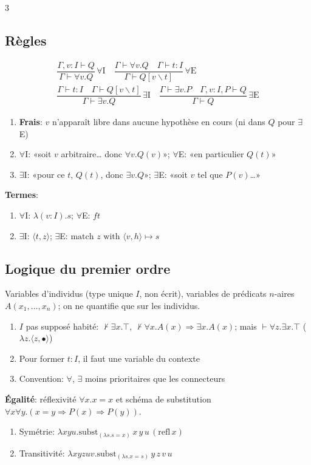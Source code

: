 \documentclass[12pt, a4paper]{article}
\newcommand{\vd}{\vdash}
\newcommand{\rul}[3]{\dfrac{#1}{#2}\,{\scriptstyle #3}}
\begin{document}
\begin{multicols*}{3}
	\subsection{Règles}
	\begin{gather*}
		\rul{\Gamma,v:I\vd Q}{\Gamma\vd\forall v.Q}{\forall\text{I}}\quad
		\rul{\Gamma\vd\forall v.Q\quad\Gamma\vd t:I}{\Gamma\vd Q[v\backslash t]}{\forall\text{E}}\\
		\rul{\Gamma\vd t:I\quad\Gamma\vd Q[v\backslash t]}{\Gamma\vd\exists v.Q}{\exists\text{I}}\quad
		\rul{\Gamma\vd\exists v.P\quad\Gamma,v:I,P\vd Q}{\Gamma\vd Q}{\exists\text{E}}
	\end{gather*}
	\begin{enumerate}[\roman*.]
		\item \textbf{Frais}: $v$ n'apparaît libre dans aucune hypothèse en cours (ni dans $Q$ pour $\exists$E)
		\item $\forall$I: «soit $v$ arbitraire… donc $\forall v.Q(v)$»; $\forall$E: «en particulier $Q(t)$»
		\item $\exists$I: «pour ce $t$, $Q(t)$, donc $\exists v.Q$»; $\exists$E: «soit $v$ tel que $P(v)$…»
	\end{enumerate}
	\textbf{Termes}:
	\begin{enumerate}[\roman*.]
		\item $\forall$I: $\lambda(v:I).s$; $\forall$E: $ft$
		\item $\exists$I: $\langle t,z\rangle$; $\exists$E: $\text{match }z\text{ with }\langle v,h\rangle\mapsto s$
	\end{enumerate}

	\subsection{Logique du premier ordre}
	Variables d'individus (type unique $I$, non écrit), variables de prédicats $n$-aires $A(x_1,\dots,x_n)$; on ne quantifie que sur les individus.
	\begin{enumerate}[\roman*.]
		\item $I$ pas supposé habité: $\nvdash\exists x.\top$, $\nvdash\forall x.A(x)\Rightarrow\exists x.A(x)$; mais $\vd\forall z.\exists x.\top$ ($\lambda z.\langle z,\bullet\rangle$)
		\item Pour former $t:I$, il faut une variable du contexte
		\item Convention: $\forall$, $\exists$ moins prioritaires que les connecteurs
	\end{enumerate}
	\textbf{Égalité}: réflexivité $\forall x.x=x$ et schéma de substitution $\forall x\forall y.(x=y\Rightarrow P(x)\Rightarrow P(y))$.
	\begin{enumerate}[\roman*.]
		\item Symétrie: $\lambda xyu.\text{subst}_{(\lambda s.s=x)}\,x\,y\,u\,(\text{refl}\,x)$
		\item Transitivité: $\lambda xyzuv.\text{subst}_{(\lambda s.x=s)}\,y\,z\,v\,u$
	\end{enumerate}


\end{multicols*}
\end{document}
